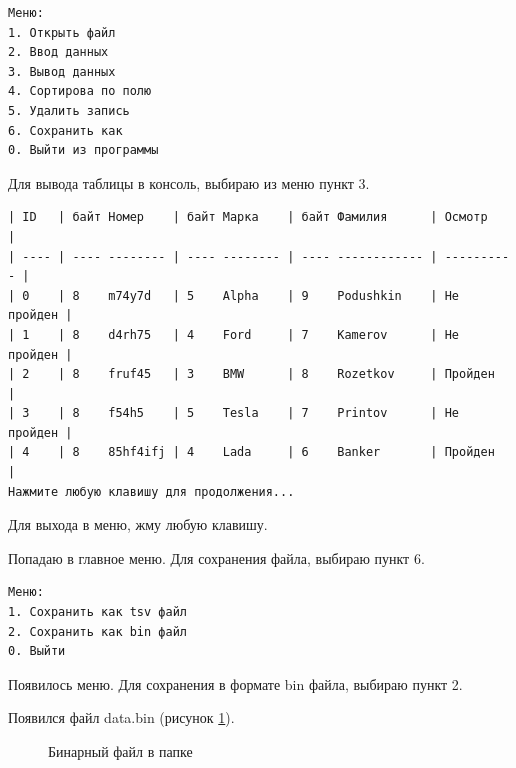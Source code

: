 \begin{tcolorbox}
\begin{verbatim}
Меню:
1. Открыть файл
2. Ввод данных
3. Вывод данных
4. Сортирова по полю
5. Удалить запись
6. Сохранить как
0. Выйти из программы
\end{verbatim}
\end{tcolorbox}

Для вывода таблицы в консоль, выбираю из меню пункт 3.
\begin{tcolorbox}
\begin{verbatim}
| ID   | байт Номер    | байт Марка    | байт Фамилия      | Осмотр     |
| ---- | ---- -------- | ---- -------- | ---- ------------ | ---------- |
| 0    | 8    m74y7d   | 5    Alpha    | 9    Podushkin    | Не пройден |
| 1    | 8    d4rh75   | 4    Ford     | 7    Kamerov      | Не пройден |
| 2    | 8    fruf45   | 3    BMW      | 8    Rozetkov     | Пройден    |
| 3    | 8    f54h5    | 5    Tesla    | 7    Printov      | Не пройден |
| 4    | 8    85hf4ifj | 4    Lada     | 6    Banker       | Пройден    |
Нажмите любую клавишу для продолжения...
\end{verbatim}
\end{tcolorbox}

Для выхода в меню, жму любую клавишу.

Попадаю в главное меню. Для сохранения файла, выбираю пункт 6.

\begin{tcolorbox}
\begin{verbatim}
Меню:
1. Сохранить как tsv файл
2. Сохранить как bin файл
0. Выйти
\end{verbatim}
\end{tcolorbox}

Появилось меню. Для сохранения в формате bin файла, выбираю пункт 2.

Появился файл data.bin (рисунок \ref{fig:far_folder}).

\begin{figure}[p]
    \caption{Бинарный файл в папке}
    \label{fig:far_folder}
\end{figure}

